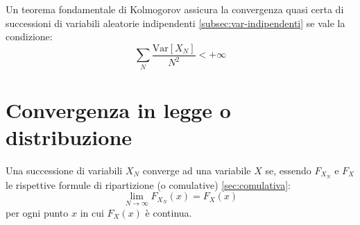 Un teorema fondamentale di Kolmogorov assicura la convergenza quasi certa di successioni di variabili aleatorie indipendenti \ref{subsec:var-indipendenti} se vale la condizione:
\begin{equation}
\sum _{ N }{ \frac { \textrm{Var}\left[ { X }_{ N } \right]  }{ { N }^{ 2 } }  } <+\infty 
\end{equation}

\section{Convergenza in legge o distribuzione} %
\label{sec:in-legge}
Una successione di variabili $X_N$ converge ad una variabile $X$ se, essendo ${ F }_{ { X }_{ N } }$ e $F_X$ le rispettive formule di ripartizione (o comulative) \ref{sec:comulativa}:
\begin{equation}
\lim _{ N\rightarrow \infty  }{ { F }_{ { X }_{ N } }\left( x \right)  } ={ F }_{ { X } }\left( x \right) 
\end{equation}
per ogni punto $x$ in cui $F_{X}(x)$ è continua.